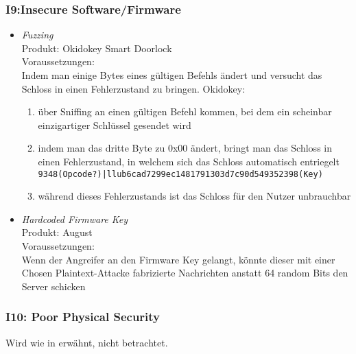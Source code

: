     \subsubsection*{I9:Insecure Software/Firmware}
        \begin{itemize}[leftmargin=0cm,label={}]
            \item \emph{Fuzzing}\cite{Rose2016}\label{vuln:fuzzing}\\
                Produkt: Okidokey Smart Doorlock\\
                Voraussetzungen: \\  
                Indem man einige Bytes eines gültigen Befehls ändert und versucht das Schloss in einen Fehlerzustand zu bringen. 
    	        Okidokey:
    	        \begin{enumerate}[noitemsep]
    	            \item über Sniffing an einen gültigen Befehl kommen, bei dem ein scheinbar einzigartiger Schlüssel gesendet wird
    	            \item indem man das dritte Byte zu 0x00 ändert, bringt man das Schloss in einen Fehlerzustand, in welchem sich das Schloss automatisch entriegelt\\
    	            \lstinline{9348(Opcode?)|llub6cad7299ec1481791303d7c90d549352398(Key)}
    	            \item während dieses Fehlerzustands ist das Schloss für den Nutzer unbrauchbar
    	        \end{enumerate} 
	        \item \emph{Hardcoded Firmware Key}\cite{Fuller2017}\label{vuln:firmwarekey}\\
                Produkt: August\\
                Voraussetzungen: \\
                Wenn der Angreifer an den Firmware Key gelangt, könnte dieser mit einer Chosen Plaintext-Attacke fabrizierte Nachrichten anstatt 64 random Bits den Server schicken
        \end{itemize}
        
    \subsubsection*{I10: Poor Physical Security}
        Wird wie in  erwähnt, nicht betrachtet.
    
